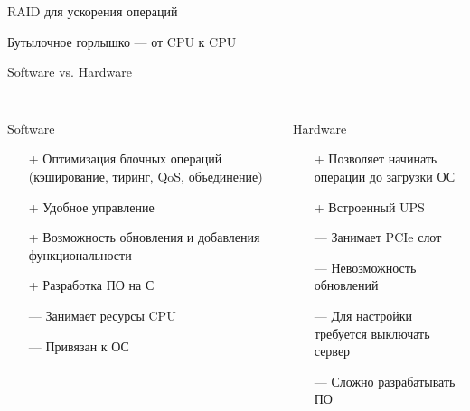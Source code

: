 \documentclass[aspectratio=169]{beamer}
\begin{document}
\begin{frame}{RAID для ускорения операций}
    \raidPerf
\end{frame}

\begin{frame}{Бутылочное горлышко --- от CPU к CPU}
    \bottleneck
\end{frame}

\begin{frame}{Software vs. Hardware}
\begin{columns}[T] %
    \begin{column}{.48\textwidth}
    \color{red}\rule{\linewidth}{4pt}
    
    Software
    \begin{itemize}
        \item[+] Оптимизация блочных операций (кэширование, тиринг, QoS, объединение)
        \item[+] Удобное управление
        \item[+] Возможность обновления и добавления функциональности
        \item[+] Разработка ПО на С
        \item[---] Занимает ресурсы CPU
        \item[---] Привязан к ОС

    \end{itemize}
    \end{column}%
    \hfill%
    \begin{column}{.48\textwidth}
    \color{blue}\rule{\linewidth}{4pt}
    
    Hardware
    \begin{itemize}
        \item[+] Позволяет начинать операции до загрузки ОС
        \item[+] Встроенный UPS 
        \item[---] Занимает PCIe слот
        \item[---] Невозможность обновлений
        \item[---] Для настройки требуется выключать сервер
        \item[---] Сложно разрабатывать ПО
    \end{itemize} 
    \end{column}%

\end{columns}
\vspace{1em}
    \let\thefootnote\relax{}
\end{frame}
\end{document}
